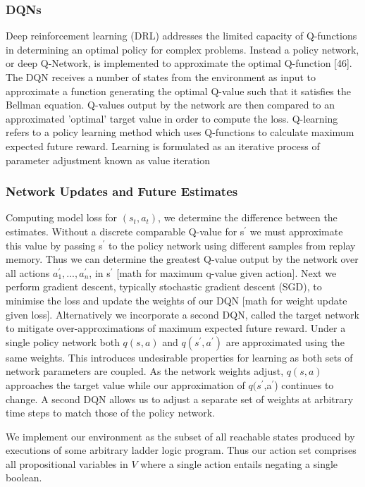 \documentclass[runningheads]{llncs}
\begin{document}
\subsubsection{DQNs}
Deep reinforcement learning (DRL) addresses the limited capacity of Q-functions in determining an optimal policy for complex problems. Instead a policy network, or deep Q-Network, is implemented to approximate the optimal Q-function [46]. The DQN receives a number of states from the environment as input to approximate a function generating the optimal Q-value such that it satisfies the Bellman equation. Q-values output by the network are then compared to an approximated 'optimal' target value in order to compute the loss. Q-learning refers to a policy learning method which uses Q-functions to calculate maximum expected future reward. Learning is formulated as an iterative process of parameter adjustment known as value iteration

\subsubsection{Network Updates and Future Estimates}
Computing model loss for $(s_t,a_t)$, we determine the difference between the estimates. Without a discrete comparable Q-value for s$^{\prime}$ we must approximate this value by passing s$^{\prime}$ to the policy network using different samples from replay memory. Thus we can determine the greatest Q-value output by the network over all actions $a^{\prime}_{1},...,a^{\prime}_n$, in s$^{\prime}$ [math for maximum q-value given action].  Next we perform gradient descent, typically stochastic gradient descent (SGD), to minimise the loss and update the weights of our DQN [math for weight update given loss]. Alternatively we incorporate a second DQN, called the target network to mitigate over-approximations of maximum expected future reward. Under a single policy network both $q(s,a)$ and $q(s^{\prime},a^{\prime})$ are approximated using the same weights. This introduces undesirable properties for learning as both sets of network parameters are coupled. As the network weights adjust, $q(s,a)$ approaches the target value while our approximation of $q(s^{\prime}$,a$^{\prime}$) continues to change. A second DQN allows us to adjust a separate set of weights at arbitrary time steps to match those of the policy network.

We implement our environment as the subset of all reachable states produced by executions of some arbitrary ladder logic program.  Thus our action set comprises all propositional variables in $V$ where a single action entails negating a single boolean.
\end{document}

